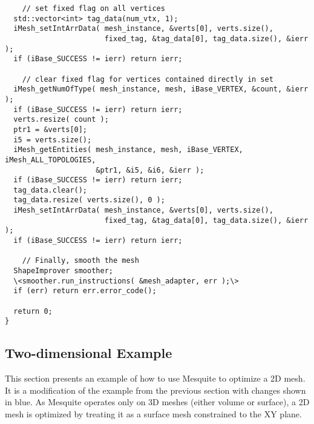 \begin{lstlisting}
    // set fixed flag on all vertices
  std::vector<int> tag_data(num_vtx, 1);
  iMesh_setIntArrData( mesh_instance, &verts[0], verts.size(), 
                       fixed_tag, &tag_data[0], tag_data.size(), &ierr );
  if (iBase_SUCCESS != ierr) return ierr;

    // clear fixed flag for vertices contained directly in set
  iMesh_getNumOfType( mesh_instance, mesh, iBase_VERTEX, &count, &ierr );
  if (iBase_SUCCESS != ierr) return ierr;
  verts.resize( count );
  ptr1 = &verts[0];
  i5 = verts.size();
  iMesh_getEntities( mesh_instance, mesh, iBase_VERTEX, iMesh_ALL_TOPOLOGIES,
                     &ptr1, &i5, &i6, &ierr );
  if (iBase_SUCCESS != ierr) return ierr;
  tag_data.clear();
  tag_data.resize( verts.size(), 0 );
  iMesh_setIntArrData( mesh_instance, &verts[0], verts.size(), 
                       fixed_tag, &tag_data[0], tag_data.size(), &ierr );
  if (iBase_SUCCESS != ierr) return ierr;

    // Finally, smooth the mesh
  ShapeImprover smoother;
  \<smoother.run_instructions( &mesh_adapter, err );\>
  if (err) return err.error_code();

  return 0;
}
\end{lstlisting}

\subsection{Two-dimensional Example}

This section presents an example of how to use Mesquite to optimize a 2D mesh.  It is a modification of the example from the previous section with changes shown in blue.  As Mesquite operates only on 3D meshes (either volume or surface), a 2D mesh is optimized by treating it as a surface mesh constrained to the XY plane.


